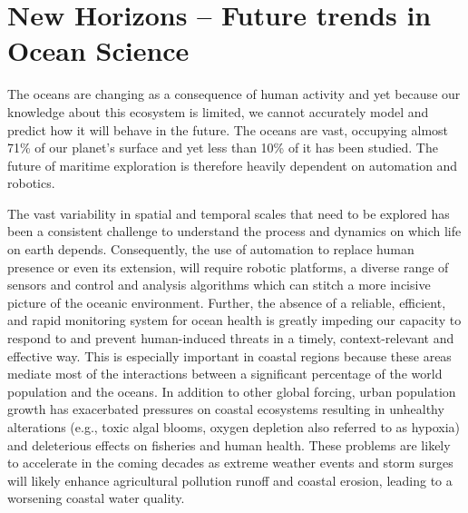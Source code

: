 \section{New Horizons -- Future trends in Ocean Science}
\label{sec:future}

The oceans are changing as a consequence of human activity and yet
because our knowledge about this ecosystem is limited, we cannot
accurately model and predict how it will behave in the future.  The
oceans are vast, occupying almost 71\% of our planet’s surface and yet
less than 10\% of it has been studied. The future of maritime
exploration is therefore heavily dependent on automation and robotics.

The vast variability in spatial and temporal scales that need to be
explored has been a consistent challenge to understand the process and
dynamics on which life on earth depends. Consequently, the use of
automation to replace human presence or even its extension, will
require robotic platforms, a diverse range of sensors and control and
analysis algorithms which can stitch a more incisive picture of the
oceanic environment.
Further, the absence of a reliable, efficient, and rapid monitoring
system for ocean health is greatly impeding our capacity to respond to
and prevent human-induced threats in a timely, context-relevant and
effective way. This is especially important in coastal regions because
these areas mediate most of the interactions between a significant
percentage of the world population and the oceans.  In addition to
other global forcing, urban population growth has exacerbated
pressures on coastal ecosystems resulting in unhealthy alterations
(e.g., toxic algal blooms, oxygen depletion also referred to as
hypoxia) and deleterious effects on fisheries and human health. These
problems are likely to accelerate in the coming decades as extreme
weather events and storm surges will likely enhance agricultural
pollution runoff and coastal erosion, leading to a worsening coastal
water quality.

